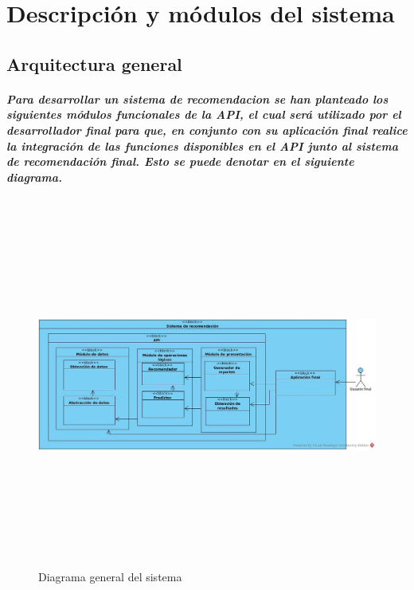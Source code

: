 \chapter {Descripción y módulos del sistema}

  \section{Arquitectura general}
    \paragraph{Para desarrollar un sistema de recomendacion se han planteado los siguientes módulos funcionales de la API, el cual será utilizado por el desarrollador final para que, en conjunto con su aplicación final realice la integración de las funciones disponibles en el API junto al sistema de recomendación final. Esto se puede denotar en el siguiente diagrama.}

\newpage
    \begin{landscape}
      \begin{figure}[h!]
      \centering
      \includegraphics[width=22.5cm,height=12cm]{./images/architecture_diagram.jpg}
      \caption{Diagrama general del sistema}
    \end{figure}
    \end{landscape}
  \newpage

